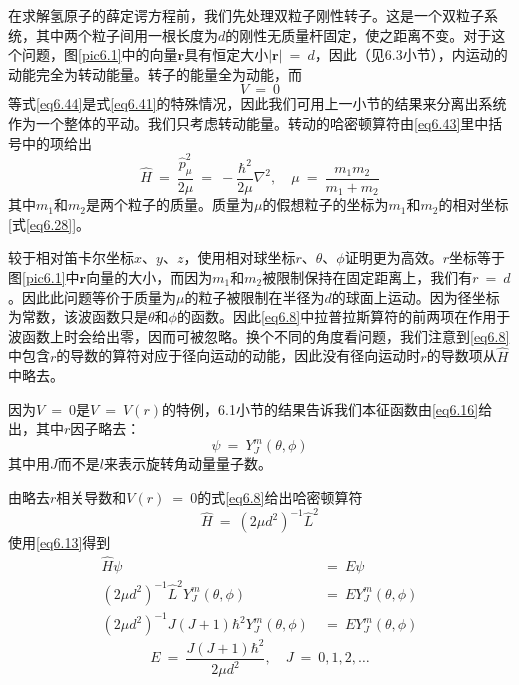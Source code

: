 \documentclass[12pt,a4paper,openany]{ctexbook}
\newcommand{\abs}[1]{\left| #1 \right|}
\newcommand{\Ham}{\hat{H}}
\begin{document}
\begin{flushleft}
    \setlength{\parindent}{2em}
在求解氢原子的薛定谔方程前，我们先处理双粒子刚性转子。这是一个双粒子系统，其中两个粒子间用一根长度为$d$的刚性无质量杆固定，使之距离不变。对于这个问题，图\ref{pic6.1}中的向量$\boldsymbol{r}$具有恒定大小$\abs{\boldsymbol{r}}\ =\ d$，因此（见6.3小节），内运动的动能完全为转动能量。转子的能量全为动能，而
\begin{equation}
    V\ =\ 0 \label{eq6.44}
\end{equation}
等式\eqref{eq6.44}是式\eqref{eq6.41}的特殊情况，因此我们可用上一小节的结果来分离出系统作为一个整体的平动。我们只考虑转动能量。转动的哈密顿算符由\eqref{eq6.43}里中括号中的项给出
\begin{equation}
    \Ham\ =\ \frac{\hat{p}_{\mu}^2}{2\mu}\ =\ -\frac{\hbar^2}{2\mu}\nabla^2,\quad\mu\ =\ \frac{m_1m_2}{m_1+m_2} \label{eq6.45}
\end{equation}
其中$m_1$和$m_2$是两个粒子的质量。质量为$\mu$的假想粒子的坐标为$m_1$和$m_2$的相对坐标[式\eqref{eq6.28}]。

较于相对笛卡尔坐标$x$、$y$、$z$，使用相对球坐标$r$、$\theta$、$\phi$证明更为高效。$r$坐标等于图\ref{pic6.1}中$\boldsymbol{r}$向量的大小，而因为$m_1$和$m_2$被限制保持在固定距离上，我们有$r\ =\ d$。因此此问题等价于质量为$\mu$的粒子被限制在半径为$d$的球面上运动。因为径坐标为常数，该波函数只是$\theta$和$\phi$的函数。因此\eqref{eq6.8}中拉普拉斯算符的前两项在作用于波函数上时会给出零，因而可被忽略。换个不同的角度看问题，我们注意到\eqref{eq6.8}中包含$r$的导数的算符对应于径向运动的动能，因此没有径向运动时$r$的导数项从$\Ham$中略去。

因为$V\ =\ 0$是$V\ =\ V(r)$的特例，6.1小节的结果告诉我们本征函数由\eqref{eq6.16}给出，其中$r$因子略去：
\begin{equation}
    \psi\ =\ Y_J^m(\theta,\phi) \label{eq6.46}
\end{equation}
其中用$J$而不是$l$来表示旋转角动量量子数。

由略去$r$相关导数和$V(r)\ =\ 0$的式\eqref{eq6.8}给出哈密顿算符
\begin{equation*}
    \Ham\ =\ (2\mu d^2)^{-1}\hat{L}^2
\end{equation*}
使用\eqref{eq6.13}得到
\begin{align*}
    \hat{H}\psi\ &=\ E\psi \\
    (2\mu d^2)^{-1}\hat{L}^2Y_J^m(\theta,\phi)\ &=\ EY_J^m(\theta,\phi) \\
    (2\mu d^2)^{-1}J(J+1)\hbar^2Y_J^m(\theta,\phi)\ &=\ EY_J^m(\theta,\phi)
\end{align*}
\begin{equation}
    E\ =\ \frac{J(J+1)\hbar^2}{2\mu d^2},\quad J\ =\ 0,1,2,\dots \label{eq6.47}
\end{equation}


\end{flushleft}
\end{document}
